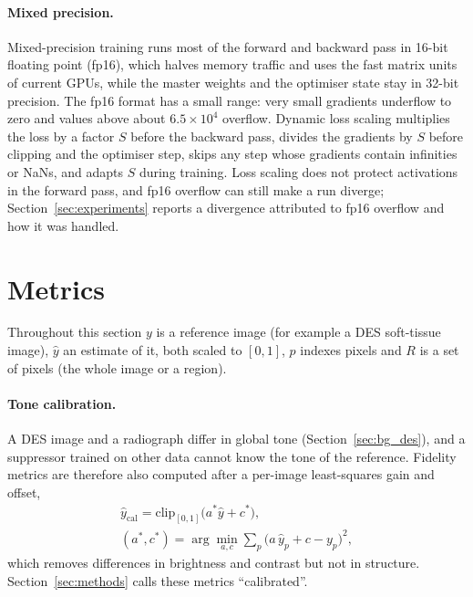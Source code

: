\paragraph{Mixed precision.} Mixed-precision training runs most of the forward and backward pass in 16-bit floating point (fp16), which halves
memory traffic and uses the fast matrix units of current GPUs, while the master weights and the optimiser state stay in 32-bit precision. The
fp16 format has a small range: very small gradients underflow to zero and values above about $6.5\times10^4$ overflow. Dynamic loss scaling
multiplies the loss by a factor $S$ before the backward pass, divides the gradients by $S$ before clipping and the optimiser step, skips any step
whose gradients contain infinities or NaNs, and adapts $S$ during training. Loss scaling does not protect activations in the forward pass, and
fp16 overflow can still make a run diverge; Section~\ref{sec:experiments} reports a divergence attributed to fp16 overflow and how it was handled.

\section{Metrics}
\label{sec:bg_metrics}
Throughout this section $y$ is a reference image (for example a DES soft-tissue image), $\hat y$ an estimate of it, both scaled to $[0,1]$, $p$
indexes pixels and $R$ is a set of pixels (the whole image or a region).

\paragraph{Tone calibration.} A DES image and a radiograph differ in global tone (Section~\ref{sec:bg_des}), and a suppressor trained on other
data cannot know the tone of the reference. Fidelity metrics are therefore also computed after a per-image least-squares gain and offset,
\begin{equation}
\begin{gathered}
\hat y_{\mathrm{cal}}=\mathrm{clip}_{[0,1]}\big(a^\ast\hat y+c^\ast\big),\\
(a^\ast,c^\ast)=\arg\min_{a,c}\sum_p\big(a\,\hat y_p+c-y_p\big)^2 ,
\end{gathered}
\label{eq:bg_calib}
\end{equation}
which removes differences in brightness and contrast but not in structure. Section~\ref{sec:methods} calls these metrics ``calibrated''.

